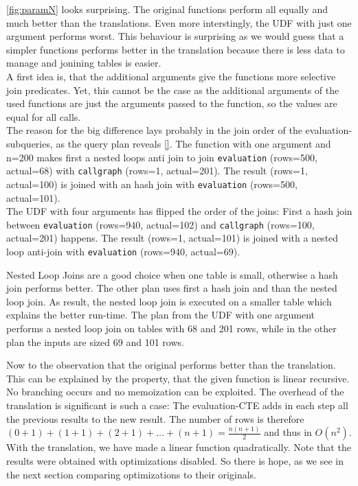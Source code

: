 \autoref{fig:paramN} looks surprising. The original functions perform all equally and much better than the translations. Even more interstingly, the UDF with just one argument performs worst. This behaviour is surprising as we would guess that a simpler functions performs better in the translation because there is less data to manage and jonining tables is easier.\\
A first idea is, that the additional arguments give the functions more selective join predicates. Yet, this cannot be the case as the additional arguments of the used functions are just the arguments passed to the function, so the values are equal for all calls.\\
The reason for the big difference lays probably in the join order of the evaluation-subqueries, as the query plan reveals \autoref{}. The function with one argument and n=200 makes first a nested loops anti join to join \texttt{evaluation} (rows=500, actual=68) with \texttt{callgraph} (rows=1, actual=201). The result (rows=1, actual=100) is joined with an hash join with \texttt{evaluation} (rows=500, actual=101).\\
The UDF with four arguments has flipped the order of the joins: First a hash join between \texttt{evaluation} (rows=940, actual=102) and \texttt{callgraph} (rows=100, actual=201) happens. The result (rows=1, actual=101) is joined with a nested loop anti-join with \texttt{evaluation} (rows=940, actual=69).

Nested Loop Joins are a good choice when one table is small, otherwise a hash join performs better. The other plan uses first a hash join and than the nested loop join. As result, the nested loop join is executed on a smaller table which explains the better run-time. The plan from the UDF with one argument performs a nested loop join on tables with 68 and 201 rows, while in the other plan the inputs are sized 69 and 101 rows.

Now to the observation that the original performs better than the translation. This can be explained by the property, that the given function is linear recursive. No branching occurs and no memoization can be exploited. The overhead of the translation is significant is such a case: The evaluation-CTE adds in each step all the previous results to the new result. The number of rows is therefore $(0 + 1) + (1 + 1) + (2 + 1) + \dots + (n + 1) = \frac{n(n+1)}{2}$ and thus in $O(n^2)$. With the translation, we have made a linear function quadratically. Note that the results were obtained with optimizations disabled. So there is hope, as we see in the next section comparing optimizations to their originals.


